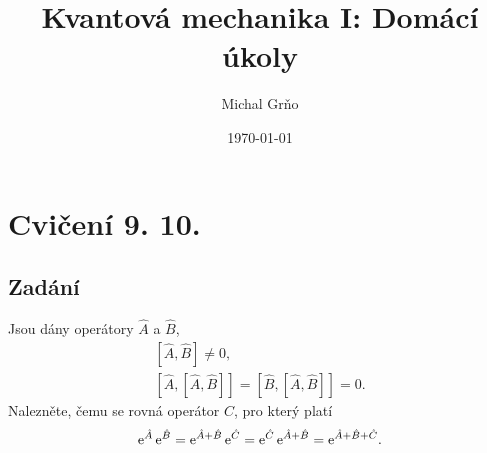 \documentclass[10pt,a4paper]{article}
\newcommand{\comm}[2]{\left[ #1, #2 \right]}
\newcommand{\const}[1]{\text{\rmfamily\upshape #1}}
\newcommand{\e}[1]{\const{e}^{#1}}
\begin{document}
\title{Kvantová mechanika I: Domácí úkoly}
\author{Michal Grňo}
\date{\today}

\maketitle

\section{Cvičení 9. 10.}

\subsection{Zadání}
Jsou dány operátory $\hat A$ a $\hat B$,
\begin{gather*}
    \comm{\hat A}{\hat B} \neq 0,
    \\[5pt]
    \comm{\hat A}{\comm{\hat A}{\hat B}} =
    \comm{\hat B}{\comm{\hat A}{\hat B}} = 0.
\end{gather*}
Nalezněte, čemu se rovná operátor $\hat C$, pro který platí
\begin{gather*}
    \e{\hat A} \, \e{\hat B} =
    \e{\hat A + \hat B} \, \e{\hat C} =
    \e{\hat C} \, \e{\hat A + \hat B} =
    \e{\hat A + \hat B + \hat C}.
\end{gather*}
\end{document}
